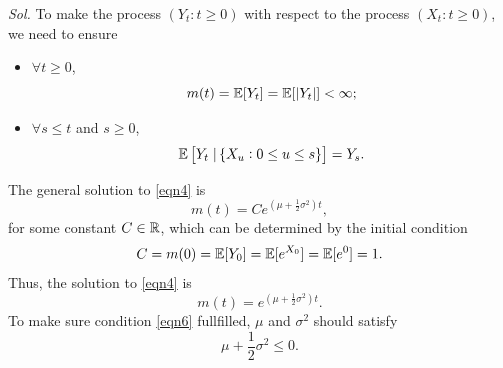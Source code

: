 \begin{enumerate}
        \textit{ Sol. } To make the process $(Y_t: t \ge 0)$ with respect to the process $(X_t: t \ge 0)$, we need to ensure
        \begin{itemize}
            \item $\forall t \ge 0$, 
            \begin{equation}
                m(t) = \mathbb{E} [Y_t] = \mathbb{E} [|Y_t|] < \infty; \label{eqn6}
            \end{equation}
            \item $\forall s \le t$ and $s \ge 0$, 
            \begin{equation}
                \mathbb{E} \left[ Y_t  \left. \right| \{X_u: 0 \le u \le s\}\right] = Y_s. \label{eqn7}
            \end{equation}
        \end{itemize}
        The general solution to \eqref{eqn4} is
        \begin{equation*}
            m(t) = C e^{(\mu + \frac{1}{2}\sigma^2) t},
        \end{equation*}
        for some constant $C \in \mathbb{R}$, which can be determined by the initial condition 
        \begin{equation*}
            C = m(0) = \mathbb{E} [Y_0] = \mathbb{E} [e^{X_0}] = \mathbb{E} [e^0] = 1.
        \end{equation*}
        Thus, the solution to \eqref{eqn4} is 
        \begin{equation*}
            m(t) = e^{(\mu + \frac{1}{2}\sigma^2) t}.
        \end{equation*}
        To make sure condition \eqref{eqn6} fullfilled, $\mu$ and $\sigma^2$ should satisfy
        \begin{equation}
            \mu + \frac{1}{2} \sigma^2 \le 0. \label{eqn8}
        \end{equation}


\end{enumerate}
